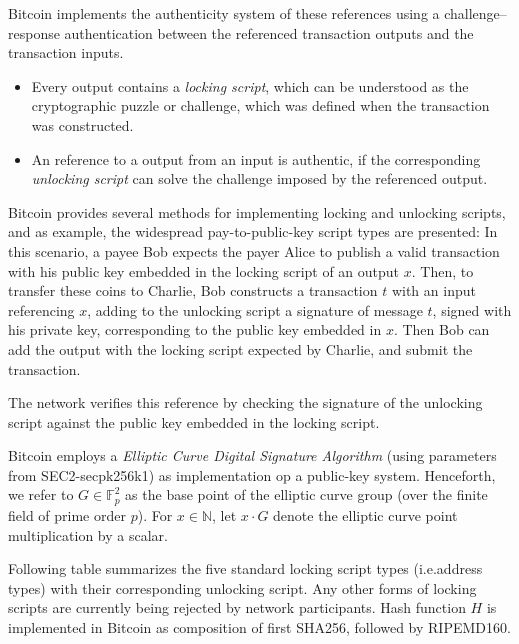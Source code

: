 \documentclass[a4paper,11pt,titlepage]{scrbook}
\begin{document}
Bitcoin implements the authenticity system of these references using a challenge–response authentication between the referenced transaction outputs and the transaction inputs.

\begin{itemize}
    \item Every output contains a \emph{locking script}, which can be understood as the cryptographic puzzle or challenge, which was defined when the transaction was constructed.
    \item An reference to a output from an input is authentic, if the corresponding \emph{unlocking script} can solve the challenge imposed by the referenced output.
\end{itemize}

Bitcoin provides several methods for implementing locking and unlocking scripts, and as example, the widespread pay-to-public-key script types are presented: In this scenario, a payee Bob expects the payer Alice to publish a valid transaction with his public key embedded in the locking script of an output $x$.
Then, to transfer these coins to Charlie, Bob constructs a transaction $t$ with an input referencing $x$, adding to the unlocking script a signature of message $t$, signed with his private key, corresponding to the public key embedded in $x$.
Then Bob can add the output with the locking script expected by Charlie, and submit the transaction. \cite[Cf. chap.~6--7]{antonopoulos_mastering_2017}


The network verifies this reference by checking the signature of the unlocking script against the public key embedded in the locking script.


Bitcoin employs a \emph{Elliptic Curve Digital Signature Algorithm} (using parameters from SEC2-secpk256k1) as implementation op a public-key system.
Henceforth, we refer to $G\in \mathbb{F}_p^2$ as the base point of the elliptic curve group (over the finite field of prime order $p$). For $x\in \mathbb{N}$, let $x\cdot G$ denote the elliptic curve point multiplication by a scalar.

Following table summarizes the five standard locking script types (i.e.\@ address types) with their corresponding unlocking script. Any other forms of locking scripts are currently being rejected by network participants.
Hash function $H$ is implemented in Bitcoin as composition of first SHA256, followed by RIPEMD160.
\end{document}
